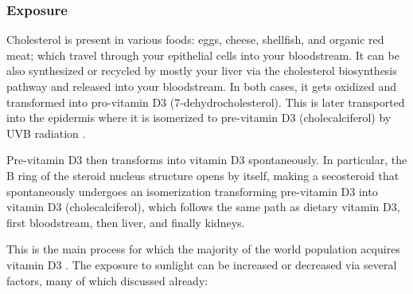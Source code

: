 \subsubsection{Exposure}
\label{vitDExposure}

Cholesterol is present in various foods: eggs, cheese, shellfish, and organic red meat; which travel through your epithelial cells into your bloodstream. It can be also synthesized or recycled by mostly your liver via the cholesterol biosynthesis pathway and released into your bloodstream. In both cases, it gets oxidized and transformed into pro-vitamin D3 (7-dehydrocholesterol). This is later transported into the epidermis where it is isomerized to pre-vitamin D3 (cholecalciferol) by UVB radiation \cite{ref:Norman1998}.

Pre-vitamin D3 then transforms into vitamin D3 spontaneously. In particular, the B ring of the steroid nucleus structure opens by itself, making a secosteroid that spontaneously undergoes an isomerization transforming pre-vitamin D3 into vitamin D3 (cholecalciferol), which follows the same path as dietary vitamin D3, first bloodstream, then liver, and finally kidneys. \vspace{3 mm}

This is the main process for which the majority of the world population acquires vitamin D3 \cite{1_Institute_of_Medicine2011-zg}. The exposure to sunlight can be increased or decreased via several factors, many of which discussed already:\vspace{3 mm}

